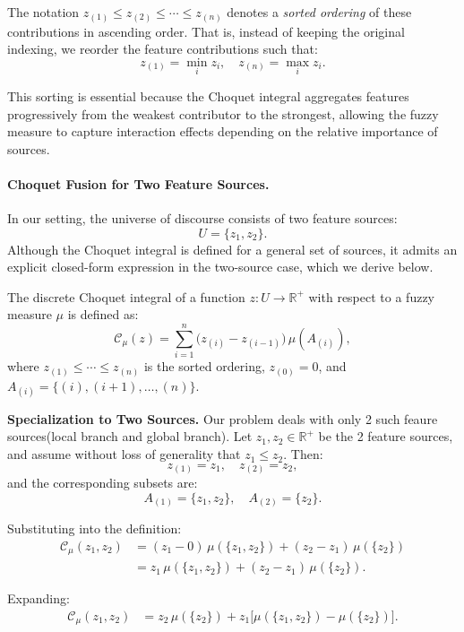 \documentclass[12pt]{article}
\begin{document}
The notation $z_{(1)} \leq z_{(2)} \leq \cdots \leq z_{(n)}$ denotes a \emph{sorted ordering} 
of these contributions in ascending order. That is, instead of keeping the original indexing, 
we reorder the feature contributions such that:
\[
z_{(1)} = \min_i z_i, \quad z_{(n)} = \max_i z_i.
\]

This sorting is essential because the Choquet integral aggregates features progressively 
from the weakest contributor to the strongest, allowing the fuzzy measure to capture 
interaction effects depending on the relative importance of sources.

\paragraph{Choquet Fusion for Two Feature Sources.}

In our setting, the universe of discourse consists of two feature sources:
\[
U = \{z_1, z_2\}.
\]
Although the Choquet integral is defined for a general set of sources, it admits an explicit closed-form expression in the two-source case, which we derive below.

The discrete Choquet integral of a function $z: U \to \mathbb{R}^+$ with respect to a fuzzy measure $\mu$ is defined as:
\[
\mathcal{C}_\mu(z)
=
\sum_{i=1}^{n} \bigl(z_{(i)} - z_{(i-1)}\bigr)\,\mu(A_{(i)}),
\]
where $z_{(1)} \leq \cdots \leq z_{(n)}$ is the sorted ordering, $z_{(0)} = 0$, and $A_{(i)} = \{(i), (i+1), \ldots, (n)\}$.

\medskip

\noindent\textbf{Specialization to Two Sources.}
Our problem deals with only 2 such feaure sources(local branch and global branch). 
Let $z_1, z_2 \in \mathbb{R}^+$ be the 2 feature sources, and assume without loss of generality that $z_1 \leq z_2$. Then:
\[
z_{(1)} = z_1, \quad z_{(2)} = z_2,
\]
and the corresponding subsets are:
\[
A_{(1)} = \{z_1, z_2\}, \quad A_{(2)} = \{z_2\}.
\]

Substituting into the definition:
\begin{align*}
\mathcal{C}_\mu(z_1, z_2)
&= (z_1 - 0)\,\mu(\{z_1, z_2\})
+ (z_2 - z_1)\,\mu(\{z_2\}) \\
&= z_1\,\mu(\{z_1, z_2\})
+ (z_2 - z_1)\,\mu(\{z_2\}).
\end{align*}

Expanding:
\begin{align*}
\mathcal{C}_\mu(z_1, z_2)
&= z_2\,\mu(\{z_2\})
+ z_1\bigl[\mu(\{z_1, z_2\}) - \mu(\{z_2\})\bigr].
\end{align*}
\end{document}
